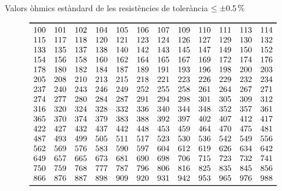 \begin{table}[htb]
   \caption{Valors \`{o}hmics est\`{a}ndard de les resist\`{e}ncies de toler\`{a}ncia $\leq\SI{\pm 0,5}{\%}$}
   \[ \begin{array}{cccccccccccc}
   \toprule[1pt]
   100 & 101 & 102 & 104 & 105 & 106 & 107 & 109 & 110 & 111 & 113 & 114 \\
   115 & 117 & 118 & 120 & 121 & 123 & 124 & 126 & 127 & 129 & 130 & 132 \\
   133 & 135 & 137 & 138 & 140 & 142 & 143 & 145 & 147 & 149 & 150 & 152 \\
   154 & 156 & 158 & 160 & 162 & 164 & 165 & 167 & 169 & 172 & 174 & 176 \\
   178 & 180 & 182 & 184 & 187 & 189 & 191 & 193 & 196 & 198 & 200 & 203 \\
   205 & 208 & 210 & 213 & 215 & 218 & 221 & 223 & 226 & 229 & 232 & 234 \\
   237 & 240 & 243 & 246 & 249 & 252 & 255 & 258 & 261 & 264 & 267 & 271 \\
   274 & 277 & 280 & 284 & 287 & 291 & 294 & 298 & 301 & 305 & 309 & 312 \\
   316 & 320 & 324 & 328 & 332 & 336 & 340 & 344 & 348 & 352 & 357 & 361 \\
   365 & 370 & 374 & 379 & 383 & 388 & 392 & 397 & 402 & 407 & 412 & 417 \\
   422 & 427 & 432 & 437 & 442 & 448 & 453 & 459 & 464 & 470 & 475 & 481 \\
   487 & 493 & 499 & 505 & 511 & 517 & 523 & 530 & 536 & 542 & 549 & 556 \\
   562 & 569 & 576 & 583 & 590 & 597 & 604 & 612 & 619 & 626 & 634 & 642 \\
   649 & 657 & 665 & 673 & 681 & 690 & 698 & 706 & 715 & 723 & 732 & 741 \\
   750 & 759 & 768 & 777 & 787 & 796 & 806 & 816 & 825 & 835 & 845 & 856 \\
   866 & 876 & 887 & 898 & 909 & 920 & 931 & 942 & 953 & 965 & 976 & 988 \\

   \bottomrule[1pt]
   \end{array}   \]
\end{table}
